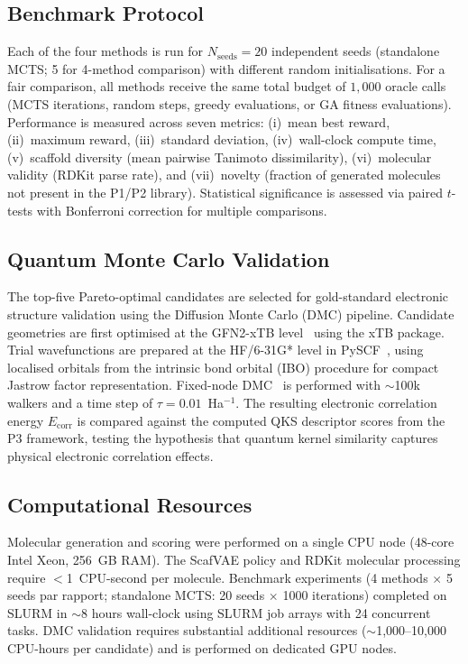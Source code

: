 \documentclass[jcim,article,layout=manuscript]{achemso}
\begin{document}
\subsection{Benchmark Protocol}
\label{sec:benchmark}

Each of the four methods is run for $N_\text{seeds}=20$ independent seeds (standalone MCTS; 5 for 4-method comparison)
with different random initialisations. For a fair comparison, all methods
receive the same total budget of $1{,}000$ oracle calls (MCTS iterations,
random steps, greedy evaluations, or GA fitness evaluations). Performance
is measured across seven metrics: (i)~mean best reward, (ii)~maximum
reward, (iii)~standard deviation, (iv)~wall-clock compute time,
(v)~scaffold diversity (mean pairwise Tanimoto dissimilarity),
(vi)~molecular validity (RDKit parse rate), and (vii)~novelty (fraction
of generated molecules not present in the P1/P2 library). Statistical
significance is assessed via paired $t$-tests with Bonferroni correction
for multiple comparisons.

\subsection{Quantum Monte Carlo Validation}
\label{sec:qmc}

The top-five Pareto-optimal candidates are selected for gold-standard
electronic structure validation using the Diffusion Monte Carlo (DMC)
pipeline. Candidate geometries are first optimised at the GFN2-xTB
level~\cite{Bannwarth2019} using the xTB package. Trial wavefunctions
are prepared at the HF/6-31G* level in PySCF~\cite{Sun2020}, using
localised orbitals from the intrinsic bond orbital (IBO) procedure for
compact Jastrow factor representation. Fixed-node DMC~\cite{Foulkes2001}
is performed with $\sim$100k walkers and a time step of $\tau=0.01$~Ha$^{-1}$.
The resulting electronic correlation energy $E_\text{corr}$ is compared
against the computed QKS descriptor scores from the P3 framework, testing
the hypothesis that quantum kernel similarity captures physical
electronic correlation effects.

\subsection{Computational Resources}
\label{sec:compute}

Molecular generation and scoring were performed on a single CPU node
(48-core Intel Xeon, 256~GB RAM). The ScafVAE policy and RDKit molecular
processing require $<$1~CPU-second per molecule. Benchmark experiments
(4 methods $\times$ 5 seeds par rapport; standalone MCTS: 20 seeds $\times$ 1000 iterations) completed on SLURM in $\sim$8 hours wall-clock
using SLURM job arrays with 24 concurrent tasks. DMC validation requires
substantial additional resources ($\sim$1,000--10,000 CPU-hours per
candidate) and is performed on dedicated GPU nodes.
\end{document}
